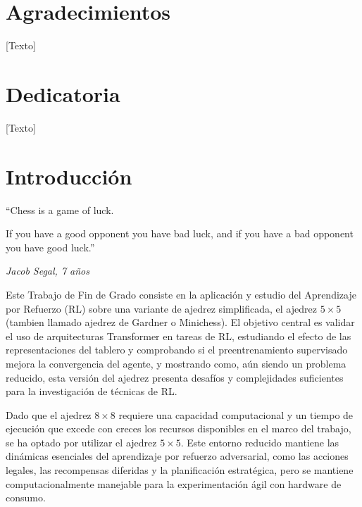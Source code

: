\documentclass[12pt, a4paper]{article}
\let\cite\supercite
\begin{document}
 

\newpage
\section*{Agradecimientos}
[Texto]
\section*{Dedicatoria}
[Texto]
\newpage

\tableofcontents

\newpage
\listoffigures
\listoftables
\newpage

\section{Introducción}\label{sec:introduccion}

\epigraph{``Chess is a game of luck. 

If you have a good opponent you have bad luck, and if you have a bad opponent you have good luck.''\cite{Segal_2007}}{\textit{Jacob Segal, 7 años}}

\vspace{30pt}

Este Trabajo de Fin de Grado consiste en la aplicación y estudio del Aprendizaje por Refuerzo (RL) sobre una variante de ajedrez simplificada, el ajedrez $5\times5$ (tambien llamado ajedrez de Gardner o Minichess). El objetivo central es validar el uso de arquitecturas Transformer en tareas de RL, estudiando el efecto de las representaciones del tablero y comprobando si el preentrenamiento supervisado mejora la convergencia del agente, y mostrando como, aún siendo un problema reducido, esta versión del ajedrez presenta desafíos y complejidades suficientes para la investigación de técnicas de RL.

Dado que el ajedrez $8\times8$ requiere una capacidad computacional y un tiempo de ejecución que excede con creces los recursos disponibles en el marco del trabajo, se ha optado por utilizar el ajedrez $5\times5$. Este entorno reducido mantiene las dinámicas esenciales del aprendizaje por refuerzo adversarial, como las acciones legales, las recompensas diferidas y la planificación estratégica, pero se mantiene computacionalmente manejable para la experimentación ágil con hardware de consumo.
\end{document}
